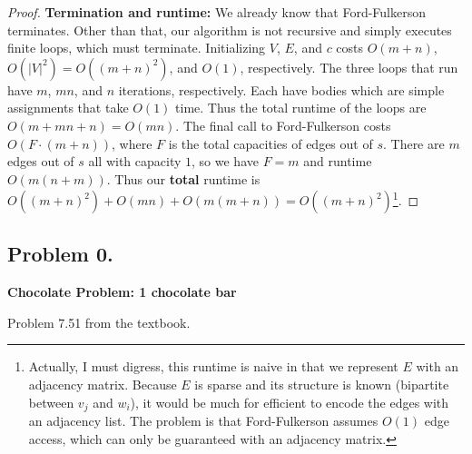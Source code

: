 \documentclass[10pt]{article}
\begin{document}
\begin{proof}
  \textbf{Termination and runtime:} We already know that Ford-Fulkerson terminates. Other than that, our algorithm is not recursive and simply executes finite loops, which must terminate. Initializing \(V\), \(E\), and \(c\) costs \(O(m + n)\), \(O(|V|^2) = O((m + n)^2)\), and \(O(1)\), respectively. The three loops that run have \(m\), \(mn\), and \(n\) iterations, respectively. Each have bodies which are simple assignments that take \(O(1)\) time. Thus the total runtime of the loops are \(O(m + mn + n) = O(mn)\). The final call to Ford-Fulkerson costs \(O(F\cdot (m + n))\), where \(F\) is the total capacities of edges out of \(s\). There are \(m\) edges out of \(s\) all with capacity \(1\), so we have \(F = m\) and runtime \(O(m(n + m))\). Thus our \textbf{total} runtime is \(O((m + n)^2) + O(mn) + O(m(m + n)) = O((m+n)^2)\)\footnote[1]{Actually, I must digress, this runtime is naive in that we represent \(E\) with an adjacency matrix. Because \(E\) is sparse and its structure is known (bipartite between \(v_j\) and \(w_i\)), it would be much for efficient to encode the edges with an adjacency list. The problem is that Ford-Fulkerson assumes \(O(1)\) edge access, which can only be guaranteed with an adjacency matrix.}.
\end{proof}

\subsection*{Problem 0.}
\textbf{Chocolate Problem: 1 chocolate bar}

Problem 7.51 from the textbook.
\end{document}
